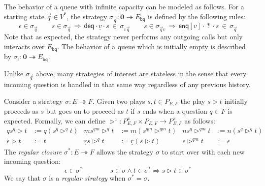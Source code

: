 \documentclass[acmsmall,screen,review,anonymous,nonacm]{acmart}
\newcommand{\kw}[1]{\ensuremath{ \mathsf{#1} }}
\newcommand{\emptysig}{\mathbf0}
\begin{document}
\begin{example} %
The behavior of a queue with infinite capacity
can be modeled as follows.
For a starting state $\vec{q} \in V^*$,
the strategy $\sigma_{\vec{q}} : \emptysig \twoheadrightarrow E_\kw{bq}$
is defined by the following rules:
\[
  \epsilon \in \sigma_{\vec{q}}
  \qquad
  s \in \sigma_{\vec{q}} \,\Rightarrow\,
  \kw{deq} \cdot \underline{v} \cdot s \, \in \, \sigma_{v \vec{q}}
  \qquad
  s \in \sigma_{\vec{q} v} \,\Rightarrow\,
  \kw{enq}[v] \cdot \underline{*} \cdot s \, \in \, \sigma_{\vec{q}}
\]
Note that as expected, the strategy never performs any outgoing calls
but only interacts over $E_\kw{bq}$.
The behavior of a queue which is initially empty
is described by $\sigma_\epsilon : \emptysig \twoheadrightarrow E_\kw{bq}$.
\end{example}


Unlike $\sigma_{\vec{q}}$ above,
many strategies of interest are stateless
in the sense that every incoming question
is handled in that same way
regardless of any previous history.

\begin{definition}
Consider a strategy $\sigma : E \twoheadrightarrow F$.
Given two plays $s, t \in P_{E,F}$
the play $s \rhd t$ initially proceeds as $s$
but goes on to proceed as $t$ if $s$ ends
when a question $q \in F$ is expected.
Formally,
we can define
$\rhd^x : P_{E,F}^x \times P_{E,F} \rightarrow P_{E,F}^x$
as follows:
\begin{align*}
  qs^q \rhd t &:= q ( s^q \rhd^q t ) &
  \underline{m} s^{qm} \rhd^q t &:= \underline{m} (s^{qm} \rhd^{qm} t) &
  n s^q \rhd^{qm} t &:= n (s^q \rhd^q t) \\
  \epsilon \rhd t &:= t &
  \underline{r} s \rhd^q t &:= \underline{r} (s \rhd t) &
  \epsilon \rhd^{qm} t &:= \epsilon
\end{align*}
The \emph{regular closure} $\sigma^* : E \twoheadrightarrow F$
allows the strategy $\sigma$
to start over with each new incoming question:
\[
  \epsilon \in \sigma^*
  \qquad \qquad
  s \in \sigma \wedge t \in \sigma^* \Rightarrow
  s \rhd t \in \sigma^*
\]
We say that $\sigma$ is a \emph{regular strategy}
when $\sigma^* = \sigma$.
\end{definition}
\end{document}
